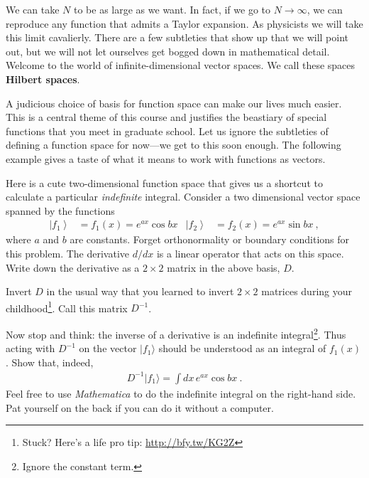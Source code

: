We can take $N$ to be as large as we want. In fact, if we go to $N\to \infty$, we can reproduce any function that admits a Taylor expansion. As physicists we will take this limit cavalierly. There are a few subtleties that show up that we will point out, but we will not let ourselves get bogged down in mathematical detail. Welcome to the world of infinite-dimensional vector spaces. We call these spaces \textbf{Hilbert spaces}.

A judicious choice of basis for function space can make our lives much easier. This is a central theme of this course and justifies the beastiary of special functions that you meet in graduate school. Let us ignore the subtleties of defining a function space for now---we get to this soon enough. The following example gives a taste of what it means to work with functions as vectors.


\begin{exercise}

Here is a cute two-dimensional function space that gives us a shortcut to calculate a particular \emph{indefinite} integral.  Consider a two dimensional vector space spanned by the functions
\begin{align}
  \left|f_1\right\rangle
  &= f_1(x) = 
  e^{ax} \cos bx
  &
  \left|f_2\right\rangle
  &=
  f_2(x) = 
  e^{ax} \sin bx \ ,
\end{align}
where $a$ and $b$ are constants. Forget orthonormality or boundary conditions for this problem. The derivative $d/dx$ is a linear operator that acts on this space. Write down the derivative as a $2\times 2$ matrix in the above basis, $D$.

Invert $D$ in the usual way that you learned to invert $2\times 2$ matrices during your childhood\footnote{Stuck? Here's a life pro tip: \url{http://bfy.tw/KG2Z}}. Call this matrix $D^{-1}$. 

Now stop and think: the inverse of a derivative is an indefinite integral\footnote{Ignore the constant term.}. Thus acting with $D^{-1}$ on the vector $|f_1\rangle$ should be understood as an integral of $f_1(x)$. Show that, indeed,
\begin{align}
  D^{-1} |f_1\rangle = \int dx\, e^{ax} \cos bx \ .
\end{align}
Feel free to use \emph{Mathematica} to do the indefinite integral on the right-hand side. Pat yourself on the back if you can do it without a computer.
\end{exercise}


